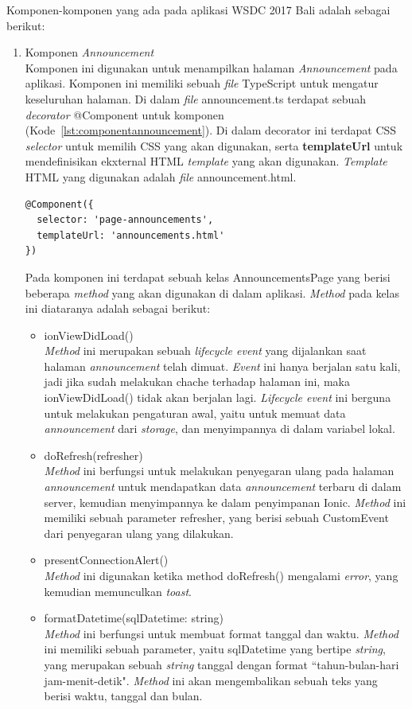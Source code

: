 Komponen-komponen yang ada pada aplikasi WSDC 2017 Bali adalah sebagai berikut:

\begin{enumerate}
	\item Komponen \textit{Announcement} \\
	Komponen ini digunakan untuk menampilkan halaman \textit{Announcement} pada aplikasi. Komponen ini memiliki sebuah \textit{file} TypeScript untuk mengatur keseluruhan halaman. Di dalam \textit{file} announcement.ts terdapat sebuah \textit{decorator} @Component untuk komponen (Kode~\ref{lst:componentannouncement}). Di dalam decorator ini terdapat CSS \textit{selector} untuk memilih CSS yang akan digunakan, serta \textbf{templateUrl} untuk mendefinisikan ekxternal HTML \textit{template} yang akan digunakan. \textit{Template} HTML yang digunakan adalah \textit{file} announcement.html. 
\begin{lstlisting}[label={lst:componentannouncement}, caption=@Component pada annoncement.ts]
@Component({
  selector: 'page-announcements',
  templateUrl: 'announcements.html'
})
\end{lstlisting} 
	Pada komponen ini terdapat sebuah kelas AnnouncementsPage yang berisi beberapa \textit{method} yang akan digunakan di dalam aplikasi. \textit{Method} pada kelas ini diataranya adalah sebagai berikut:
	\begin{itemize}
		\item ionViewDidLoad() \\
		\textit{Method} ini merupakan sebuah \textit{lifecycle event} yang dijalankan saat halaman \textit{announcement} telah dimuat. \textit{Event} ini hanya berjalan satu kali, jadi jika sudah melakukan chache terhadap halaman ini, maka ionViewDidLoad() tidak akan berjalan lagi. \textit{Lifecycle event} ini berguna untuk melakukan pengaturan awal, yaitu untuk memuat data \textit{announcement} dari \textit{storage}, dan menyimpannya di dalam variabel lokal. 
		\item doRefresh(refresher) \\
		\textit{Method} ini berfungsi untuk melakukan penyegaran ulang pada halaman \textit{announcement} untuk mendapatkan data \textit{announcement} terbaru di dalam server, kemudian menyimpannya ke dalam penyimpanan Ionic. \textit{Method} ini memiliki sebuah parameter refresher, yang berisi sebuah CustomEvent dari penyegaran ulang yang dilakukan.
		\item presentConnectionAlert() \\
		\textit{Method} ini digunakan ketika method doRefresh() mengalami \textit{error}, yang kemudian memunculkan \textit{toast}.
		\item formatDatetime(sqlDatetime: string) \\
		\textit{Method} ini berfungsi untuk membuat format tanggal dan waktu. \textit{Method} ini memiliki sebuah parameter, yaitu sqlDatetime yang bertipe \textit{string}, yang merupakan sebuah \textit{string} tanggal dengan format ``tahun-bulan-hari jam-menit-detik". \textit{Method} ini akan mengembalikan sebuah teks yang berisi waktu, tanggal dan bulan.
	\end{itemize}


\end{enumerate}
